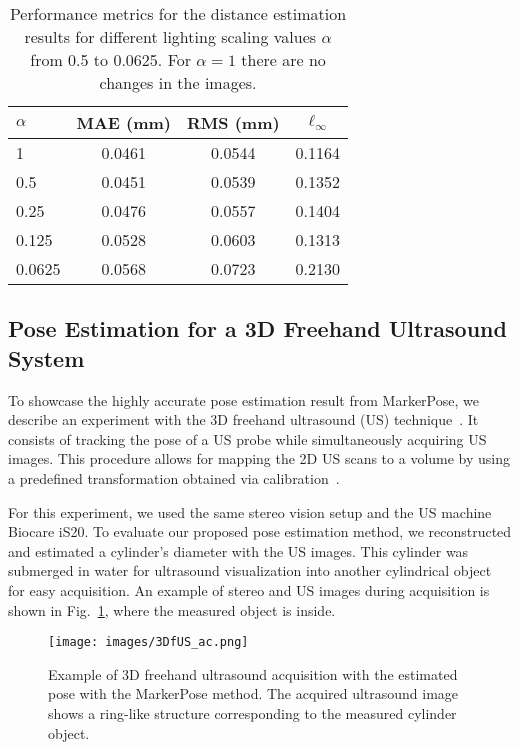 \documentclass[final]{cvpr}
\begin{document}
\begin{table}[h]
\centering
\begin{tabular}{lccc}
\textbf{$\alpha$} & \textbf{MAE (mm)} & \textbf{RMS (mm)} & \textbf{$\ell_\infty$} \\ \hline
1                & 0.0461            & 0.0544            & 0.1164                 \\
0.5              & 0.0451            & 0.0539            & 0.1352                 \\
0.25             & 0.0476            & 0.0557            & 0.1404                 \\
0.125            & 0.0528            & 0.0603            & 0.1313                 \\
0.0625           & 0.0568            & 0.0723            & 0.2130                 \\ \hline
\end{tabular}
\caption{Performance metrics for the distance estimation results for different lighting scaling values $\alpha$ from 0.5 to 0.0625. For $\alpha = 1$ there are no changes in the images.}
\label{tab:lighting_evaluation}
\end{table}



\subsection{Pose Estimation for a 3D Freehand Ultrasound System}
To showcase the highly accurate pose estimation result from MarkerPose, we describe an experiment with the 3D freehand ultrasound (US) technique~\cite{Huang:2017cd}. It consists of tracking the pose of a US probe while simultaneously acquiring US images. This procedure allows for mapping the 2D US scans to a volume by using a predefined transformation obtained via calibration~\cite{meza2020low}.

For this experiment, we used the same stereo vision setup and the US machine Biocare iS20. To evaluate our proposed pose estimation method, we reconstructed and estimated a cylinder's diameter with the US images. This cylinder was submerged in water for ultrasound visualization into another cylindrical object for easy acquisition. An example of stereo and US images during acquisition is shown in Fig.~\ref{fig:3DfUS_acquisition}, where the measured object is inside.

\begin{figure}[h]
    \centering
    \texttt{[image: images/3DfUS\_ac.png]}
    \caption{Example of 3D freehand ultrasound acquisition with the estimated pose with the MarkerPose method. The acquired ultrasound image shows a ring-like structure corresponding to the measured cylinder object.}
    \label{fig:3DfUS_acquisition}
\end{figure}
\end{document}
